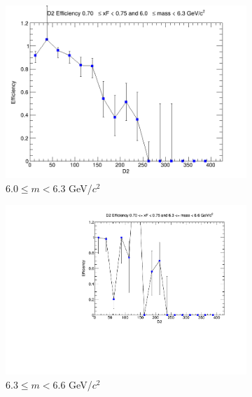 \begin{figure}[p]
\begin{subfigure}[b]{0.32\textwidth}
        \includegraphics[width=\textwidth]{./kTrackerEfficiencyPlots/D2_Efficiency_xF14_mass6.png}
        \caption{$6.0 \leq m < 6.3$ GeV/$c^2$}
        \label{fig:xF14_mass6}
    \end{subfigure}
    \hfill
    \begin{subfigure}[b]{0.32\textwidth}
        \centering
        \includegraphics[width=\textwidth]{./kTrackerEfficiencyPlots/D2_Efficiency_xF14_mass7.pdf}
        \caption{$6.3 \leq m < 6.6$ GeV/$c^2$}
        \label{fig:xF14_mass7}
    \end{subfigure}
    \hfill
    \begin{subfigure}[b]{0.32\textwidth}
        \centering

\end{subfigure}
\end{figure}
